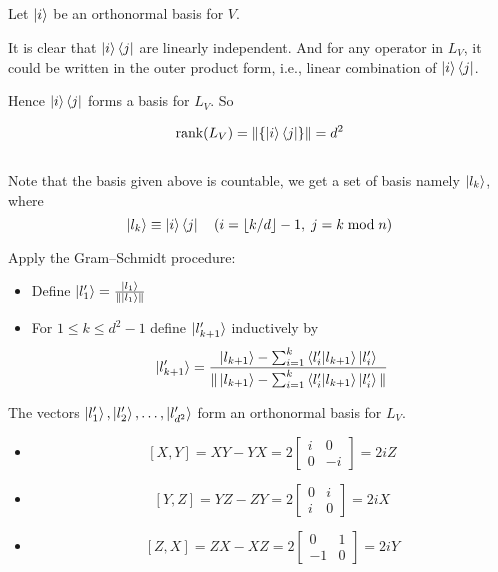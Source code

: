 \documentclass{homeworg}
\begin{document}
\subsection{}
Let $\ket{i}$ be an orthonormal basis for $V$.

It is clear that $\ket{i}\bra{j}$ are linearly independent. And for any operator in $L_V$,
it could be written in the outer product form, i.e., linear combination of $\ket{i}\bra{j}$.

Hence $\ket{i}\bra{j}$ forms a basis for $L_V$. So

\[\text{rank}(L_V)=\|\{\ket{i}\bra{j}\}\|=d^2\]
\subsection{}
Note that the basis given above is countable, we get a set of basis namely $\ket{l_k}$, where 
\[\ket{l_k}\equiv\ket{i}\bra{j}\quad(i=\lfloor k / d \rfloor -1,\;j = k\;\text{mod}\;n)\]

Apply the Gram–Schmidt procedure:

\begin{itemize}
    \item Define $\ket{l_1^\prime}=\frac{\ket{l_1}}{\|\ket{l_1}\|}$
    \item For $1\leq k \leq d^2 -1$ define $\ket{l_{k+1}^\prime}$ inductively by
    \[\ket{l_{k+1}^\prime}=\frac{\ket{l_{k+1}}-\sum_{i=1}^k\braket{l_i^\prime|l_{k+1}}\ket{l_i^\prime}}{\|\ket{l_{k+1}}-\sum_{i=1}^k\braket{l_i^\prime|l_{k+1}}\ket{l_i^\prime}\|}\]
\end{itemize}

The vectors $\ket{l_1^\prime},\ket{l_2^\prime},\dots,\ket{l_{d^2}^\prime}$ form an orthonormal basis for $L_V$. 

\exercise*
\begin{itemize}
    \item 
    \[[X,Y]=XY-YX=2\begin{bmatrix}i & 0\\0&-i\end{bmatrix}=2iZ\]
    \item
    \[[Y,Z]=YZ-ZY=2\begin{bmatrix}0 & i\\i&0\end{bmatrix}=2iX\]
    \item
    \[[Z,X]=ZX-XZ=2\begin{bmatrix}0 & 1\\-1&0\end{bmatrix}=2iY\]
\end{itemize}
\end{document}
